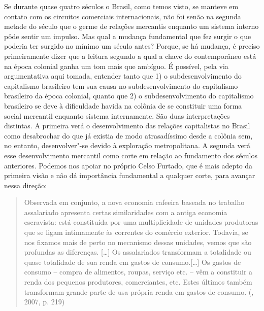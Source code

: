 Se durante quase quatro séculos o Brasil, como temos visto, se manteve
em contato com os circuitos comerciais internacionais, não foi senão na
segunda metade do século  que o germe de relações mercantis enquanto
um sistema interno pôde sentir um impulso. Mas qual a mudança
fundamental que fez surgir o que poderia ter surgido no mínimo um século
antes? Porque, se há mudança, é preciso primeiramente dizer que a
leitura segundo a qual a chave do contemporâneo está na época colonial
ganha um tom mais que ambíguo. É possível, pela via argumentativa aqui
tomada, entender tanto que 1) o subdesenvolvimento do capitalismo
brasileiro tem sua causa no subdesenvolvimento do capitalismo brasileiro
da época colonial, quanto que 2) o subdesenvolvimento do capitalismo
brasileiro se deve à dificuldade havida na colônia de se constituir uma
forma social mercantil enquanto sistema internamente. São duas
interpretações distintas. A primeira verá o desenvolvimento das relações
capitalistas no Brasil como desabrochar do que já existia de modo
atrasadíssimo desde a colônia sem, no entanto, desenvolver"-se devido à
exploração metropolitana. A segunda verá esse desenvolvimento mercantil
como corte em relação ao fundamento dos séculos anteriores. Podemos nos
apoiar no próprio Celso Furtado, que é mais adepto da primeira visão e
não dá importância fundamental a qualquer corte, para avançar nessa
direção:

\begin{quote}
Observada em conjunto, a nova economia cafeeira baseada no trabalho
assalariado apresenta certas similaridades com a antiga economia
escravista: está constituída por uma multiplicidade de unidades
produtoras que se ligam intimamente às correntes do comércio exterior.
Todavia, se nos fixamos mais de perto no mecanismo dessas unidades,
vemos que são profundas as diferenças. [\ldots{}] Os assalariados
transformam a totalidade ou quase totalidade de sua renda em gastos de
consumo.[\ldots{}] Os gastos de consumo -- compra de alimentos, roupas,
serviço etc. -- vêm a constituir a renda dos pequenos produtores,
comerciantes, etc. Estes últimos também transformam grande parte de usa
própria renda em gastos de consumo. (, 2007, p. 219)
\end{quote}


